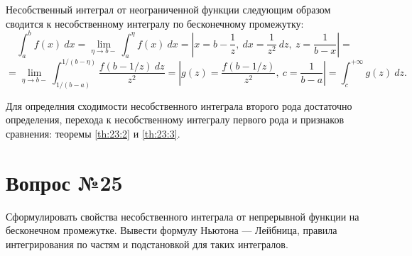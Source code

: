 \documentclass[12pt]{report}
\numberwithin{equation}{section}
\begin{document}
Несобственный интеграл от неограниченной функции следующим образом сводится к несобственному интегралу по бесконечному промежутку:
\[ \int_a^b f(x)~dx = \lim_{\eta \to b-} \int_a^{\eta} f(x)~dx = \left| x = b - \frac{1}{z},~ dx = \frac{1}{z^2}~dz,~z = \frac{1}{b-x} \right| = \]
\[ = \lim_{\eta \to b-} \int_{1 / (b-a)}^{1/(b-\eta)} \frac{f(b-1/z)~dz}{z^2} = \left| g(z) = \frac{f(b-1/z)}{z^2},~c = \frac{1}{b-a} \right| = \int_c^{+\infty} g(z)~dz.\]

Для определния сходимости несобственного интеграла второго рода достаточно определения, перехода к несобственному интегралу первого рода и признаков сравнения: теоремы \ref{th:23:2} и \ref{th:23:3}.

\newpage \section{Вопрос №25} %
\begin{framed}
Сформулировать свойства несобственного интеграла от непрерывной функции на бесконечном промежутке. Вывести формулу Ньютона --- Лейбница, правила интегрирования по частям и подстановкой для таких интегралов.
\end{framed}
\end{document}
